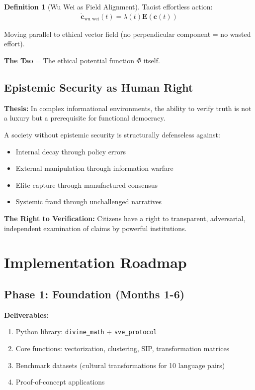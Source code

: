 \documentclass[11pt,a4paper]{article}
\theoremstyle{definition}
\newtheorem{definition}{Definition}[section]
\theoremstyle{remark}
\newcommand{\EE}{\mathbf{E}}
\newcommand{\cc}{\mathbf{c}}
\begin{document}
\begin{definition}[Wu Wei as Field Alignment]
Taoist effortless action:
\begin{align}
\dot{\cc}_{\text{wu wei}}(t) = \lambda(t) \EE(\cc(t))
\end{align}

Moving parallel to ethical vector field (no perpendicular component = no wasted effort).

\textbf{The Tao} = The ethical potential function $\Phi$ itself.
\end{definition}

\subsection{Epistemic Security as Human Right}

\textbf{Thesis:} In complex informational environments, the ability to verify truth is not a luxury but a prerequisite for functional democracy.

A society without epistemic security is structurally defenseless against:
\begin{itemize}
\item Internal decay through policy errors
\item External manipulation through information warfare
\item Elite capture through manufactured consensus
\item Systemic fraud through unchallenged narratives
\end{itemize}

\textbf{The Right to Verification:} Citizens have a right to transparent, adversarial, independent examination of claims by powerful institutions.

\section{Implementation Roadmap}

\subsection{Phase 1: Foundation (Months 1-6)}

\textbf{Deliverables:}
\begin{enumerate}
\item Python library: \texttt{divine\_math} + \texttt{sve\_protocol}
\item Core functions: vectorization, clustering, SIP, transformation matrices
\item Benchmark datasets (cultural transformations for 10 language pairs)
\item Proof-of-concept applications
\end{enumerate}
\end{document}
